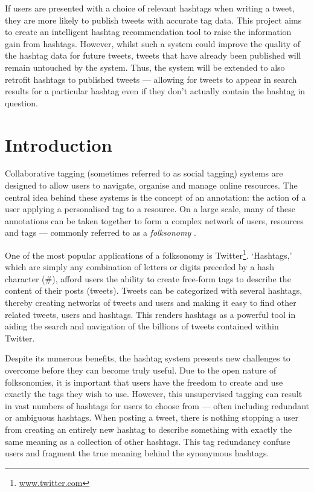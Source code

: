 \documentclass[12pt,a4paper]{article}
\begin{document}
If users are presented with a choice of relevant hashtags when writing a tweet, they are more likely to publish tweets with accurate tag data. This project aims to create an intelligent hashtag recommendation tool to raise the information gain from hashtags. However, whilst such a system could improve the quality of the hashtag data for future tweets, tweets that have already been published will remain untouched by the system. Thus, the system will be extended to also retrofit hashtags to published tweets --- allowing for tweets to appear in search results for a particular hashtag even if they don't actually contain the hashtag in question.
\pagebreak

\tableofcontents

\pagebreak

\section{Introduction}
Collaborative tagging (sometimes referred to as social tagging) systems are designed to allow users to navigate, organise and manage online resources. The central idea behind these systems is the concept of an annotation: the action of a user applying a personalised tag to a resource. On a large scale, many of these annotations can be taken together to form a complex network of users, resources and tags --- commonly referred to as a \emph{folksonomy} \parencite{Xu:2008}.

One of the most popular applications of a folksonomy is Twitter\footnote{\url{www.twitter.com}}. `Hashtags,' which are simply any combination of letters or digits preceded by a hash character (\#), afford users the ability to create free-form tags to describe the content of their posts (tweets). Tweets can be categorized with several hashtags, thereby creating networks of tweets and users and making it easy to find other related tweets, users and hashtags. This renders hashtags as a powerful tool in aiding the search and navigation of the billions of tweets contained within Twitter.

Despite its numerous benefits, the hashtag system presents new challenges to overcome before they can become truly useful. Due to the open nature of folksonomies, it is important that users have the freedom to create and use exactly the tags they wish to use. However, this unsupervised tagging can result in vast numbers of hashtags for users to choose from --- often including redundant or ambiguous hashtags. When posting a tweet, there is nothing stopping a user from creating an entirely new hashtag to describe something with exactly the same meaning as a collection of other hashtags. This tag redundancy confuse users and fragment the true meaning behind the synonymous hashtags.
\end{document}
